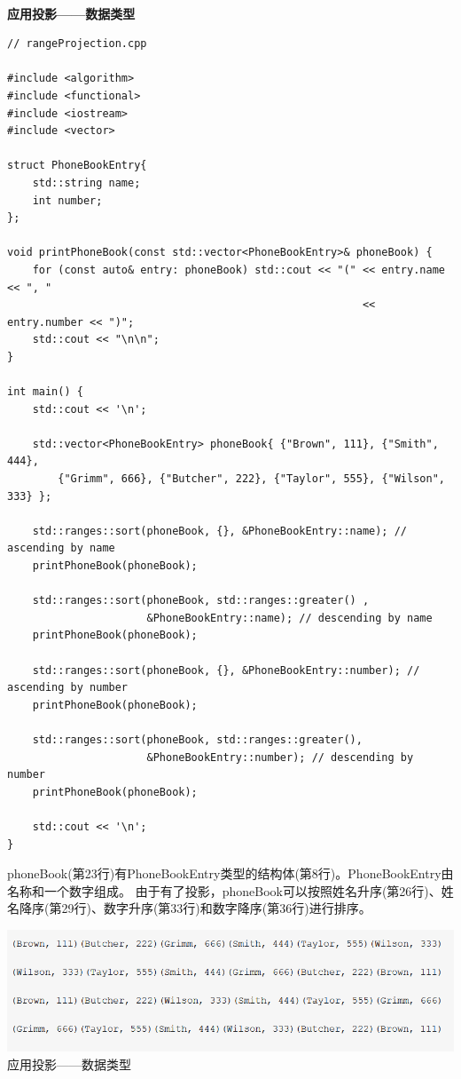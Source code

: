 \hspace*{\fill} \\ %
\noindent
\textbf{应用投影——数据类型}
\begin{lstlisting}[style=styleCXX]
// rangeProjection.cpp

#include <algorithm>
#include <functional>
#include <iostream>
#include <vector>

struct PhoneBookEntry{
	std::string name;
	int number;
};

void printPhoneBook(const std::vector<PhoneBookEntry>& phoneBook) {
	for (const auto& entry: phoneBook) std::cout << "(" << entry.name << ", "
	                                                    << entry.number << ")";
	std::cout << "\n\n";
}

int main() {
	std::cout << '\n';
	
	std::vector<PhoneBookEntry> phoneBook{ {"Brown", 111}, {"Smith", 444},
		{"Grimm", 666}, {"Butcher", 222}, {"Taylor", 555}, {"Wilson", 333} };
	
	std::ranges::sort(phoneBook, {}, &PhoneBookEntry::name); // ascending by name
	printPhoneBook(phoneBook);
	
	std::ranges::sort(phoneBook, std::ranges::greater() ,
	                  &PhoneBookEntry::name); // descending by name
	printPhoneBook(phoneBook);
	
	std::ranges::sort(phoneBook, {}, &PhoneBookEntry::number); // ascending by number
	printPhoneBook(phoneBook);
	
	std::ranges::sort(phoneBook, std::ranges::greater(),
	                  &PhoneBookEntry::number); // descending by number
	printPhoneBook(phoneBook);
	
	std::cout << '\n';
}
\end{lstlisting}

phoneBook(第23行)有PhoneBookEntry类型的结构体(第8行)。PhoneBookEntry由名称和一个数字组成。 由于有了投影，phoneBook可以按照姓名升序(第26行)、姓名降序(第29行)、数字升序(第33行)和数字降序(第36行)进行排序。

\begin{center}
\includegraphics[width=1.0\textwidth]{content/3/chapter5/images/1-1.png}\\
应用投影——数据类型
\end{center}

